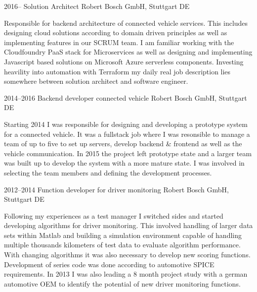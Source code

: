 \documentclass[]{friggeri-cv} %
\begin{document}
\begin{entrylist}


\entry
{2016--}
{Solution Architect}
{Robert Bosch GmbH, Stuttgart DE}
{Responsible for backend architecture of connected vehicle services. This includes designing cloud solutions according to domain driven principles as well as implementing features in our SCRUM team. I am familiar working with the Cloudfoundry PaaS stack for Microservices as well as designing and implementing Javascript based solutions on Microsoft Azure serverless components. Investing heavility into automation with Terraform my daily real job description lies somewhere between solution architect and software engineer.

}
\end{entrylist}
\begin{entrylist}
\entry
{2014--2016}
{Backend developer connected vehicle}
{Robert Bosch GmbH, Stuttgart DE}
{Starting 2014 I was responsible for designing and developing a prototype system for a connected vehicle. It was a fullstack job where I was resonsible to manage a team of up to five to set up servers, develop backend \& frontend as well as the vehicle communication. In 2015 the project left prototype state and a larger team was built up to develop the system with a more mature state. I was involved in selecting the team members and defining the development processes.

}
\end{entrylist}
\begin{entrylist}
\entry
{2012--2014}
{Function developer for driver monitoring}
{Robert Bosch GmbH, Stuttgart DE}
{Following my experiences as a test manager I switched sides and started developing algorithms for driver monitoring. This involved handling of larger data sets within Matlab and building a simulation environment capable of handling multiple thousands kilometers of test data to evaluate algorithm performance. With changing algorithms it was also necessary to develop new scoring functions. Development of series code was done according to automotive SPICE requirements. In 2013 I was also leading a 8 month project study with a german automotive OEM to identify the potential of new driver monitoring functions.

}
\end{entrylist}
\end{document}
